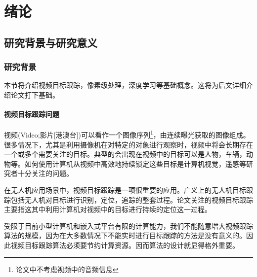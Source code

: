 
\chapter{绪论}

\section{研究背景与研究意义}

\subsection{研究背景}
本节将介绍视频目标跟踪，像素级处理，深度学习等基础概念。这将为后文详细介绍论文打下基础。

\subsubsection{视频目标跟踪问题}
视频(Video;影片[港澳台])可以看作一个图像序列\footnote{论文中不考虑视频中的音频信息}，由连续曝光获取的图像组成。很多情况下，尤其是利用摄像机在对特定的对象进行观察时，视频中将会长期存在一个或多个需要关注的目标。典型的会出现在视频中的目标可以是人物，车辆，动物等。如何使用计算机从视频中高效地持续锁定这些目标是计算机视觉，遥感等研究者十分关注的问题。
\par
在无人机应用场景中，视频目标跟踪是一项很重要的应用。广义上的无人机目标跟踪包括无人机对目标进行识别，定位，追踪的整套过程。论文关注的视频目标跟踪主要指这其中利用计算机对视频中的目标进行持续的定位这一过程。
\par
受限于目前小型计算机和嵌入式平台有限的计算能力，我们不能随意增大视频跟踪算法的规模，因为在大多数情况下不能实时进行目标跟踪的方法是没有意义的。因此视频目标跟踪算法必须要节约计算资源。因而算法的设计就显得格外重要。

